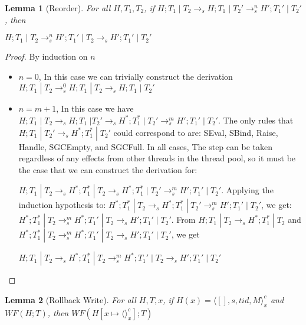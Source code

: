 \documentclass[9pt]{article}
\newtheorem{lemma}{Lemma}
\newcommand\specStep{\rightarrow_{s}}
\begin{document}
\begin{lemma}[Reorder]
\label{reorderLemma}
For all $H, T_1, T_2$, if $H; T_1 \; | \; T_2 \specStep H; T_1 \; | \; T_2' \specStep^n H'; T_1' \; | \; T_2'$, then 

$H; T_1 \; | \; T_2 \specStep^n H'; T_1' \; | \; T_2 \specStep H'; T_1' \; | \; T_2'$

\end{lemma}

\begin{proof}

By induction on $n$

\begin{itemize}
\item $n = 0$, In this case we can trivially construct the derivation $H; T_1 \; | \; T_2 \specStep^0 H; T_1 \; | \; T_2 \specStep H; T_1 \; | \; T_2'$

\item $n = m+1$, In this case we have $H; T_1 \; | \; T_2 \specStep H; T_1 \; | T_2' \specStep H^*; T_1^* \; | \; T_2' \specStep^m H'; T_1' \; | \; T_2'$.  The only rules that $H; T_1 \; | \; T_2' \specStep H^*; T_1^* \; | \; T_2'$ could correspond to are: SEval, SBind, Raise, Handle, SGCEmpty, and SGCFull.  In all cases, The step can be taken regardless of any effects from other threads in the thread pool, so it must be the case that we can construct the derivation for:

$H; T_1 \; | \; T_2 \specStep H^*; T_1^* \; | \; T_2 \specStep H^*; T_1^* \; | \; T_2' \specStep^m H'; T_1' \; | \; T_2'$.  Applying the induction hypothesis to: $H^*; T_1^* \; | \; T_2 \specStep H^*; T_1^* \; | \; T_2' \specStep^m H'; T_1' \; | \; T_2'$, we get: $H^*; T_1^* \; | \; T_2 \specStep^m H^*; T_1' \; | \; T_2 \specStep H'; T_1' \; | \; T_2'$.  From 
$H; T_1 \; | \; T_2 \specStep H^*; T_1^* \; | \; T_2$ and $H^*; T_1^* \; | \; T_2 \specStep^m H^*; T_1' \; | \; T_2 \specStep H'; T_1' \; | \; T_2'$, we get

$H; T_1\; | \; T_2 \specStep H^*; T_1^* \; | \; T_2 \specStep^m H^*; T_1' \; | \; T_2 \specStep H'; T_1' \; | \; T_2'$
\end{itemize}

\end{proof}

\begin{lemma}[Rollback Write]
For all $H, T, x$, if $H(x) = \langle [], s, tid, M\rangle_x^c$ and $WF(H; T)$, then $WF(H[x \mapsto \langle\rangle_x^c]; T)$
\end{lemma}
\end{document}
